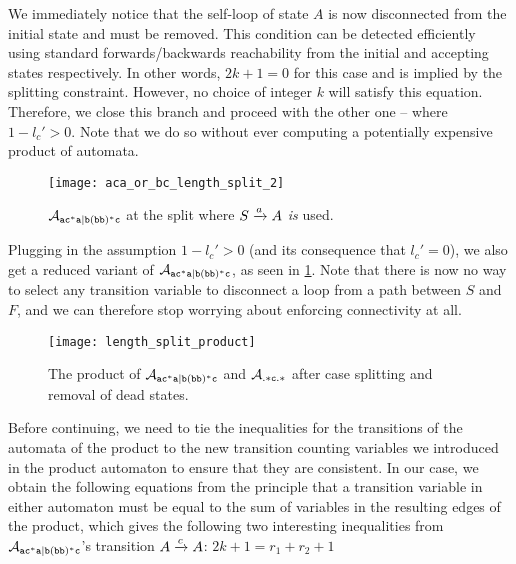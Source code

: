 \documentclass[acmsmall,review,anonymous,screen]{acmart}\settopmatter{printfolios=true,printccs=false,printacmref=true}
\theoremstyle{definition}
\begin{document}
  We immediately notice that the self-loop of state $A$ is now disconnected from
  the initial state and must be removed. This condition can be detected
  efficiently using standard forwards/backwards reachability from the initial
  and accepting states respectively. In other words, $2k+1 = 0$ for this case
  and is implied by the splitting constraint. However, no choice of integer $k$
  will satisfy this equation. Therefore, we close this branch and proceed with
  the other one -- where $1-l_c' > 0$. Note that we do so without ever computing
  a potentially expensive product of automata.

  \begin{figure}[t]
    \centering 
      \texttt{[image: aca\_or\_bc\_length\_split\_2]}
      \caption{$\mathcal{A}_{\mathtt{ac^*a|b(bb)^*c}}{}$ at the split where $S \xrightarrow{a} A$ \emph{is} used.}\label{fig:aca-or-bc-length-split-2}
    \end{figure}
  
Plugging in the assumption $1-l_c' > 0$ (and its consequence that $l_c' = 0$),
we also get a reduced variant of $\mathcal{A}_{\mathtt{ac^*a|b(bb)^*c}}$, as seen in
\cref{fig:aca-or-bc-length-split-2}. Note that there is now no way to select any
transition variable to disconnect a loop from a path between $S$ and $F$,
and we can therefore stop worrying about enforcing connectivity at all.

\begin{figure}[t]
  \centering 
    \texttt{[image: length\_split\_product]}
    \caption{The product of $\mathcal{A}_{\mathtt{ac^*a|b(bb)^*c}}$ and $\mathcal{A}_{\mathtt{.*c.*}}$ after
    case splitting and removal of dead states.}\label{fig:length-split-product}
  \end{figure}

Before continuing, we need to tie the inequalities for the transitions of the
automata of the product to the new transition counting variables we introduced
in the product automaton to ensure that they are consistent. In our case, we
obtain the following equations from the principle that a transition variable in
either automaton must be equal to the sum of variables in the resulting edges of
the product, which gives the following two interesting inequalities from
$\mathcal{A}_{\mathtt{ac^*a|b(bb)^*c}}{}$'s transition $A \xrightarrow{c} A$: $2k + 1 = r_1 + r_2 + 1$
\end{document}
